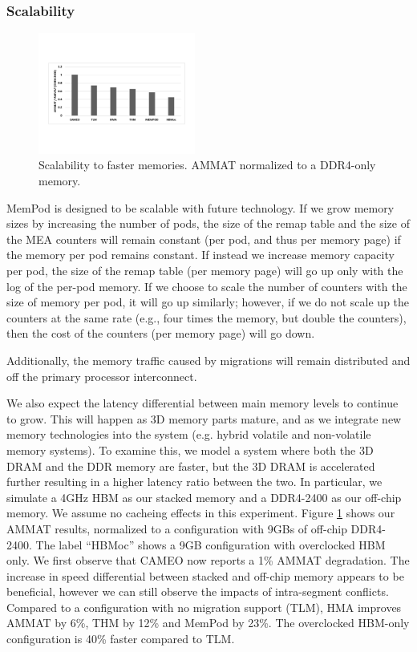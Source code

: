 \subsubsection{Scalability}

\begin{figure}
  \includegraphics[width=0.46\textwidth]{figures/revised/new/scalability_speed.pdf}
  \caption{Scalability to faster memories. AMMAT normalized to a DDR4-only memory.}
  \label{fig:scalability}
\end{figure}

MemPod is designed to be scalable with future technology.  If we grow memory
sizes by increasing the number of pods, the size of the remap table and the 
size of the MEA counters will remain constant (per pod, and thus per memory
page) if the memory per pod remains constant.  If instead we increase
memory capacity per pod, the size of the remap table (per memory page)
will go up only with the log of the per-pod memory. If we choose to scale
the number of counters with the size of memory per pod, it will go up
similarly; however, if we do not scale up the counters at the same rate
(e.g., four times the memory, but double the counters), then the cost
of the counters (per memory page) will go down.

Additionally, the memory traffic caused by migrations will remain distributed
and off the primary processor interconnect.

We also expect the latency differential between main memory levels to 
continue to grow.  This will happen as 3D memory parts mature, and as
we integrate new memory technologies into the system (e.g. hybrid
volatile and non-volatile memory systems).
To examine this, we model a system where both the 3D DRAM and the DDR memory
are faster, but the 3D DRAM is accelerated further resulting in a higher
latency ratio between the two. 
In particular, we simulate a 4GHz HBM as our stacked memory and a DDR4-2400 as our off-chip memory. 
We assume no cacheing effects in this experiment.
Figure \ref{fig:scalability} shows our AMMAT results, normalized to a configuration with 9GBs of off-chip DDR4-2400. The label ``HBMoc'' shows a 9GB configuration with overclocked HBM only. We first observe that CAMEO now reports a 1\% AMMAT degradation. The increase in speed differential between stacked and off-chip memory appears to be beneficial, however we can still observe the impacts of intra-segment conflicts. Compared to a configuration with no migration support (TLM), HMA improves AMMAT by 6\%, THM by 12\% and MemPod by 23\%. The overclocked HBM-only configuration is 40\% faster compared to TLM.

